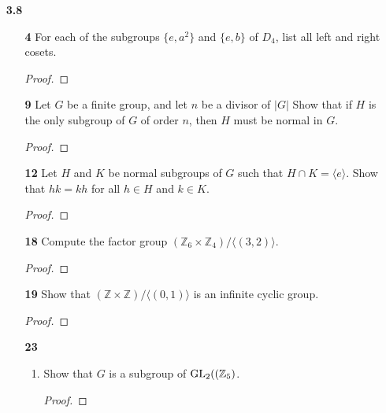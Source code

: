 \documentclass[paper=usletter, fontsize=12pt]{article}
\begin{document}
\begin{itemize}
\begin{enumerate}
        \end{enumerate}

        \item[\textbf{3.8}]
        \begin{enumerate}

            \item[\textbf{4}] For each of the subgroups $\{e, a^2\}$ and
            $\{e,b\}$ of $D_4$, list all left and right cosets.
            \begin{proof}
            \end{proof}

            \item[\textbf{9}] Let $G$ be a finite group, and let $n$ be a
            divisor of $|G|$ Show that if $H$ is the only subgroup of $G$ of
            order $n$, then $H$ must be normal in $G$.
            \begin{proof}
            \end{proof}

            \item[\textbf{12}] Let $H$ and $K$ be normal subgroups of $G$ such
            that $H \cap K=\langle e \rangle$. Show that $hk=kh$ for all $h \in
            H$ and $k \in K$.
            \begin{proof}
            \end{proof}

            \item[\textbf{18}] Compute the factor group $(\mathbb{Z}_6 \times
            \mathbb{Z}_4)/ \langle(3,2)\rangle$.
            \begin{proof}
            \end{proof}

            \item[\textbf{19}] Show that $(\mathbb{Z} \times \mathbb{Z})/
            \langle(0,1)\rangle$ is an infinite cyclic group.
            \begin{proof}
            \end{proof}

            \item[\textbf{23}]
            \begin{enumerate}

                \item Show that $G$ is a subgroup of $\text{GL}_2((\mathbb{Z}_5)$.
                \begin{proof}
                \end{proof}


\end{enumerate}
\end{enumerate}
\end{itemize}
\end{document}
